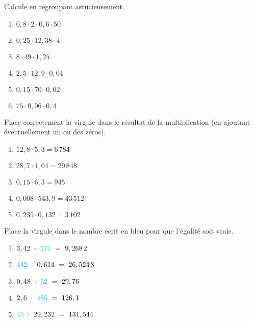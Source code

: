 \begin{exercice}
Calcule en regroupant astucieusement.
\begin{enumerate} 
 \item $0,8 \cdot 2 \cdot 0,6 \cdot 50$ \dotfill \hspace*{8em}
 
 \item $0,25 \cdot 12,38 \cdot 4$ \dotfill \hspace*{8em}
 
 \item $8 \cdot 49 \cdot 1,25$ \dotfill \hspace*{8em}
 
 \item $2,5 \cdot 12,9 \cdot 0,04$ \dotfill \hspace*{8em}
 
 \item $0,15 \cdot 70 \cdot 0,02$ \dotfill \hspace*{8em}
 
 \item $75 \cdot 0,06 \cdot 0,4$ \dotfill \hspace*{8em}
 
 \end{enumerate} 
\end{exercice}


\begin{exercice}
Place correctement la virgule dans le résultat de la multiplication (en ajoutant éventuellement un ou des zéros).
\begin{enumerate} 
 \item $12,8 \cdot  5,3 = 6\,784$
 \item $28,7 \cdot 1,04 = 29\,848$
 \item $0,15 \cdot 6,3 = 945$
 \item $0,008 \cdot 543,9 = 43\,512$
 \item $0,235 \cdot 0,132 = 3\,102$
 \end{enumerate}
\end{exercice}


\begin{exercice}
Place la virgule dans le nombre écrit en \textcolor{BleuOuv}{bleu} pour que l'égalité soit vraie.
\begin{enumerate} 
 \item $3,42 \cdot \textcolor{BleuOuv}{271} = 9,268\,2$
 \item $\textcolor{BleuOuv}{432} \cdot 0,614 = 26,524\,8$
 \item $0,48 \cdot \textcolor{BleuOuv}{62} = 29,76$
 \item $2,6 \cdot \textcolor{BleuOuv}{485} = 126,1$
 \item $\textcolor{BleuOuv}{45} \cdot 29,232 = 131,544$
 \end{enumerate}
\end{exercice}

